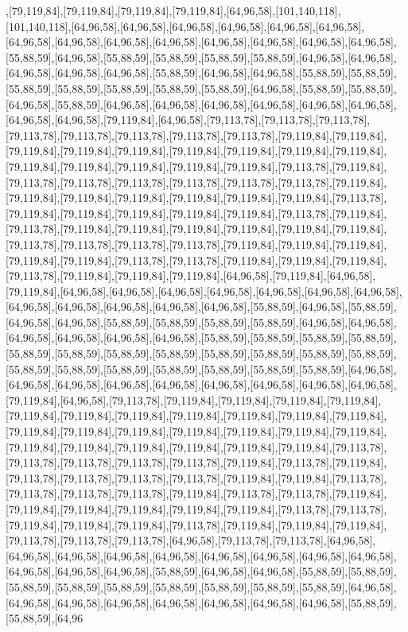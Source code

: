 ,[79,119,84],[79,119,84],[79,119,84],[79,119,84],[64,96,58],[101,140,118],[101,140,118],[64,96,58],[64,96,58],[64,96,58],[64,96,58],[64,96,58],[64,96,58],[64,96,58],[64,96,58],[64,96,58],[64,96,58],[64,96,58],[64,96,58],[64,96,58],[64,96,58],[55,88,59],[64,96,58],[55,88,59],[55,88,59],[55,88,59],[55,88,59],[64,96,58],[64,96,58],[64,96,58],[64,96,58],[64,96,58],[55,88,59],[64,96,58],[64,96,58],[55,88,59],[55,88,59],[55,88,59],[55,88,59],[55,88,59],[55,88,59],[55,88,59],[64,96,58],[55,88,59],[55,88,59],[64,96,58],[55,88,59],[64,96,58],[64,96,58],[64,96,58],[64,96,58],[64,96,58],[64,96,58],[64,96,58],[64,96,58],[79,119,84],[64,96,58],[79,113,78],[79,113,78],[79,113,78],[79,113,78],[79,113,78],[79,113,78],[79,113,78],[79,113,78],[79,119,84],[79,119,84],[79,119,84],[79,119,84],[79,119,84],[79,119,84],[79,119,84],[79,119,84],[79,119,84],[79,119,84],[79,119,84],[79,119,84],[79,119,84],[79,119,84],[79,113,78],[79,119,84],[79,113,78],[79,113,78],[79,113,78],[79,113,78],[79,113,78],[79,113,78],[79,119,84],[79,119,84],[79,119,84],[79,119,84],[79,119,84],[79,119,84],[79,119,84],[79,113,78],[79,119,84],[79,119,84],[79,119,84],[79,119,84],[79,119,84],[79,113,78],[79,119,84],[79,113,78],[79,119,84],[79,119,84],[79,119,84],[79,119,84],[79,119,84],[79,119,84],[79,113,78],[79,113,78],[79,113,78],[79,113,78],[79,119,84],[79,119,84],[79,119,84],[79,119,84],[79,119,84],[79,113,78],[79,113,78],[79,119,84],[79,119,84],[79,119,84],[79,113,78],[79,119,84],[79,119,84],[79,119,84],[64,96,58],[79,119,84],[64,96,58],[79,119,84],[64,96,58],[64,96,58],[64,96,58],[64,96,58],[64,96,58],[64,96,58],[64,96,58],[64,96,58],[64,96,58],[64,96,58],[64,96,58],[64,96,58],[55,88,59],[64,96,58],[55,88,59],[64,96,58],[64,96,58],[55,88,59],[55,88,59],[55,88,59],[55,88,59],[64,96,58],[64,96,58],[64,96,58],[64,96,58],[64,96,58],[64,96,58],[55,88,59],[55,88,59],[55,88,59],[55,88,59],[55,88,59],[55,88,59],[55,88,59],[55,88,59],[55,88,59],[55,88,59],[55,88,59],[55,88,59],[55,88,59],[55,88,59],[55,88,59],[55,88,59],[55,88,59],[55,88,59],[55,88,59],[64,96,58],[64,96,58],[64,96,58],[64,96,58],[64,96,58],[64,96,58],[64,96,58],[64,96,58],[64,96,58],[79,119,84],[64,96,58],[79,113,78],[79,119,84],[79,119,84],[79,119,84],[79,119,84],[79,119,84],[79,119,84],[79,119,84],[79,119,84],[79,119,84],[79,119,84],[79,119,84],[79,119,84],[79,119,84],[79,119,84],[79,119,84],[79,119,84],[79,119,84],[79,119,84],[79,119,84],[79,119,84],[79,119,84],[79,119,84],[79,119,84],[79,119,84],[79,113,78],[79,113,78],[79,113,78],[79,113,78],[79,113,78],[79,119,84],[79,113,78],[79,119,84],[79,113,78],[79,113,78],[79,113,78],[79,113,78],[79,119,84],[79,119,84],[79,113,78],[79,113,78],[79,113,78],[79,113,78],[79,119,84],[79,113,78],[79,113,78],[79,119,84],[79,119,84],[79,119,84],[79,119,84],[79,119,84],[79,119,84],[79,113,78],[79,113,78],[79,119,84],[79,119,84],[79,119,84],[79,113,78],[79,119,84],[79,119,84],[79,119,84],[79,113,78],[79,113,78],[79,113,78],[64,96,58],[79,113,78],[79,113,78],[64,96,58],[64,96,58],[64,96,58],[64,96,58],[64,96,58],[64,96,58],[64,96,58],[64,96,58],[64,96,58],[64,96,58],[64,96,58],[64,96,58],[55,88,59],[64,96,58],[64,96,58],[55,88,59],[55,88,59],[55,88,59],[55,88,59],[55,88,59],[55,88,59],[55,88,59],[55,88,59],[55,88,59],[64,96,58],[64,96,58],[64,96,58],[64,96,58],[64,96,58],[64,96,58],[64,96,58],[64,96,58],[55,88,59],[55,88,59],[64,96